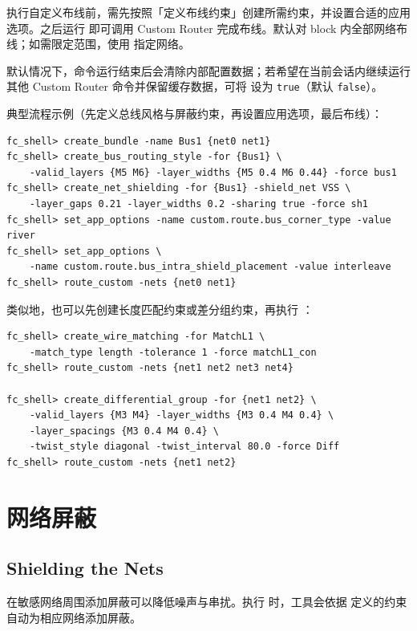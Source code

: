 执行自定义布线前，需先按照「定义布线约束」创建所需约束，并设置合适的应用选项。之后运行  即可调用 Custom Router 完成布线。默认对 block 内全部网络布线；如需限定范围，使用  指定网络。

默认情况下，命令运行结束后会清除内部配置数据；若希望在当前会话内继续运行其他 Custom Router 命令并保留缓存数据，可将  设为 \texttt{true}（默认 \texttt{false}）。

典型流程示例（先定义总线风格与屏蔽约束，再设置应用选项，最后布线）：

\begin{lstlisting}
fc_shell> create_bundle -name Bus1 {net0 net1}
fc_shell> create_bus_routing_style -for {Bus1} \
    -valid_layers {M5 M6} -layer_widths {M5 0.4 M6 0.44} -force bus1
fc_shell> create_net_shielding -for {Bus1} -shield_net VSS \
    -layer_gaps 0.21 -layer_widths 0.2 -sharing true -force sh1
fc_shell> set_app_options -name custom.route.bus_corner_type -value river
fc_shell> set_app_options \
    -name custom.route.bus_intra_shield_placement -value interleave
fc_shell> route_custom -nets {net0 net1}
\end{lstlisting}

类似地，也可以先创建长度匹配约束或差分组约束，再执行 ：

\begin{lstlisting}
fc_shell> create_wire_matching -for MatchL1 \
    -match_type length -tolerance 1 -force matchL1_con
fc_shell> route_custom -nets {net1 net2 net3 net4}

fc_shell> create_differential_group -for {net1 net2} \
    -valid_layers {M3 M4} -layer_widths {M3 0.4 M4 0.4} \
    -layer_spacings {M3 0.4 M4 0.4} \
    -twist_style diagonal -twist_interval 80.0 -force Diff
fc_shell> route_custom -nets {net1 net2}
\end{lstlisting}

\section{网络屏蔽}
\subsection*{Shielding the Nets}

在敏感网络周围添加屏蔽可以降低噪声与串扰。执行  时，工具会依据  定义的约束自动为相应网络添加屏蔽。

